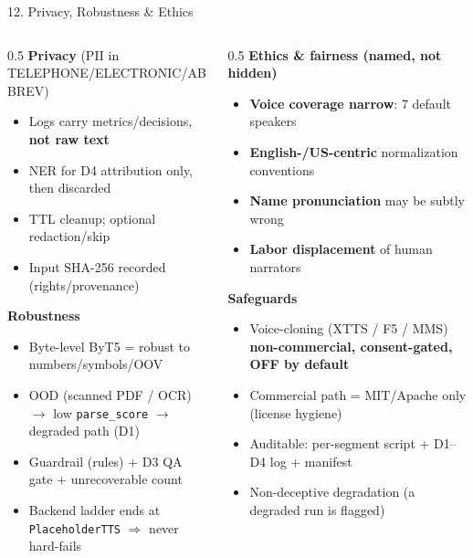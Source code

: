 \documentclass[10pt,aspectratio=169]{beamer}
\begin{document}
\begin{frame}{12. Privacy, Robustness \& Ethics}
\begin{columns}[T]
\begin{column}{0.5\textwidth}
\textbf{Privacy} (PII in TELEPHONE/ELECTRONIC/ABBREV)
\begin{itemize}\scriptsize
  \item Logs carry metrics/decisions, \textbf{not raw text}
  \item NER for D4 attribution only, then discarded
  \item TTL cleanup; optional redaction/skip
  \item Input SHA-256 recorded (rights/provenance)
\end{itemize}

\textbf{Robustness}
\begin{itemize}\scriptsize
  \item Byte-level ByT5 = robust to numbers/symbols/OOV
  \item OOD (scanned PDF / OCR) $\rightarrow$ low \texttt{parse\_score} $\rightarrow$ degraded path (D1)
  \item Guardrail (rules) + D3 QA gate + unrecoverable count
  \item Backend ladder ends at \texttt{PlaceholderTTS} $\Rightarrow$ never hard-fails
\end{itemize}
\end{column}
\begin{column}{0.5\textwidth}
\textbf{Ethics \& fairness (named, not hidden)}
\begin{itemize}\scriptsize
  \item \textbf{Voice coverage narrow}: 7 default speakers
  \item \textbf{English-/US-centric} normalization conventions
  \item \textbf{Name pronunciation} may be subtly wrong
  \item \textbf{Labor displacement} of human narrators
\end{itemize}

\textbf{Safeguards}
\begin{itemize}\scriptsize
  \item Voice-cloning (XTTS / F5 / MMS) \textbf{non-commercial, consent-gated, OFF by default}
  \item Commercial path = MIT/Apache only (license hygiene)
  \item Auditable: per-segment script + D1--D4 log + manifest
  \item Non-deceptive degradation (a degraded run is flagged)
\end{itemize}
\end{column}
\end{columns}
\end{frame}
\end{document}

